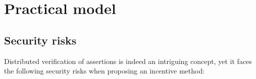 \documentclass[runningheads]{llncs}
\begin{document}
 









\section{Practical model}
\subsection{Security risks}
Distributed verification of assertions is indeed an intriguing concept, yet it faces the following security risks when proposing an incentive method:
\end{document}
